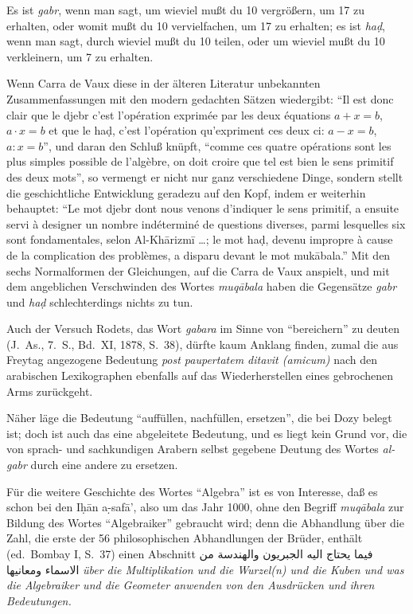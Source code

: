 \documentclass[11pt,a4paper]{article}
\newcommand{\RL}[1]{\beginR#1\endR}
\newcommand{\s}[1]{\d{#1}}     %
\newcommand{\hw}{\d{h}}       %
\newcommand{\ar}[1]{{\arabicfont\RL{#1}}}
\newcommand{\enquote}[1]{``#1''}
\begin{document}
Es ist \textit{gabr}, wenn man sagt, um wieviel mu\ss{}t du 10 vergr\"o\ss{}ern, um 17 zu erhalten, oder womit mu\ss{}t du 10 vervielfachen, um 17 zu erhalten; es ist \textit{ha\d{d}}, wenn man sagt, durch wieviel mu\ss{}t du 10 teilen, oder um wieviel mu\ss{}t du 10 verkleinern, um 7 zu erhalten.

Wenn Carra de Vaux diese in der \"alteren Literatur unbekannten Zusammenfassungen mit den modern gedachten S\"atzen wiedergibt: \enquote{Il est donc clair que le djebr c'est l'op\'eration exprim\'ee par les deux \'equations $a + x = b$, $a \cdot x = b$ et que le ha\d{d}, c'est l'op\'eration qu'expriment ces deux ci: $a - x = b$, $a : x = b$}, und daran den Schlu\ss{} kn\"upft, \enquote{comme ces quatre op\'erations sont les plus simples possible de l'alg\`ebre, on doit croire que tel est bien le sens primitif des deux mots}, so vermengt er nicht nur ganz verschiedene Dinge, sondern stellt die geschichtliche Entwicklung geradezu auf den Kopf, indem er weiterhin behauptet: \enquote{Le mot djebr dont nous venons d'indiquer le sens primitif, a ensuite servi \`a designer un nombre ind\'etermin\'e de questions diverses, parmi lesquelles six sont fondamentales, selon Al-Kh\=arizm\=i \ldots; le mot ha\d{d}, devenu impropre \`a cause de la complication des probl\`emes, a disparu devant le mot muk\=abala.} Mit den sechs Normalformen der Gleichungen, auf die Carra de Vaux anspielt, und mit dem angeblichen Verschwinden des Wortes \textit{muq\=abala} haben die Gegens\"atze \textit{gabr} und \textit{ha\d{d}} schlechterdings nichts zu tun.

Auch der Versuch Rodets, das Wort \textit{gabara} im Sinne von \enquote{bereichern} zu deuten (J.\ As., 7.\ S., Bd.\ XI, 1878, S.\ 38), d\"urfte kaum Anklang finden, zumal die aus Freytag angezogene Bedeutung \textit{post paupertatem ditavit (amicum)} nach den arabischen Lexikographen ebenfalls auf das Wiederherstellen eines gebrochenen Arms zur\"uckgeht.

N\"aher l\"age die Bedeutung \enquote{auff\"ullen, nachf\"ullen, ersetzen}, die bei Dozy belegt ist; doch ist auch das eine abgeleitete Bedeutung, und es liegt kein Grund vor, die von sprach- und sachkundigen Arabern selbst gegebene Deutung des Wortes \textit{al-gabr} durch eine andere zu ersetzen.

F\"ur die weitere Geschichte des Wortes \enquote{Algebra} ist es von Interesse, da\ss{} es schon bei den I\hw{}\=an a\s-s{}af\=a', also um das Jahr 1000, ohne den Begriff \textit{muq\=abala} zur Bildung des Wortes \enquote{Algebraiker} gebraucht wird; denn die Abhandlung \"uber die Zahl, die erste der 56 philosophischen Abhandlungen der Br\"uder, enth\"alt (ed.\ Bombay I, S.\ 37) einen Abschnitt \ar{فيما يحتاج اليه الجبريون والهندسة من الاسماء ومعانيها} \textit{\"uber die Multiplikation und die Wurzel(n) und die Kuben und was die Algebraiker und die Geometer anwenden von den Ausdr\"ucken und ihren Bedeutungen.}
\end{document}
